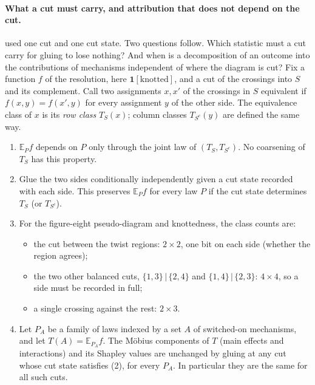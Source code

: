 \documentclass[11pt]{article}
\theoremstyle{definition}\newtheorem{definition}[theorem]{Definition}\newtheorem{remark}[theorem]{Remark}\newtheorem{example}[theorem]{Example}\newtheorem{problem}[theorem]{Open problem}\crefname{problem}{Problem}{Problems}
\begin{document}
\paragraph{What a cut must carry, and attribution that does not depend on the cut.}  used one cut and one cut state. Two questions follow. Which statistic must a cut carry for gluing to lose nothing? And when is a decomposition of an outcome into the contributions of mechanisms independent of where the diagram is cut? Fix a function $f$ of the resolution, here $\mathbf 1[\text{knotted}]$, and a cut of the crossings into $S$ and its complement. Call two assignments $x,x'$ of the crossings in $S$ equivalent if $f(x,y)=f(x',y)$ for every assignment $y$ of the other side. The equivalence class of $x$ is its \emph{row class} $T_S(x)$; column classes $T_{S^c}(y)$ are defined the same way.

\begin{proposition}\label{prop:boundary}
\begin{enumerate}
\item[(1)] $\mathbb E_Pf$ depends on $P$ only through the joint law of $(T_S,T_{S^c})$. No coarsening of $T_S$ has this property.
\item[(2)] Glue the two sides conditionally independently given a cut state recorded with each side. This preserves $\mathbb E_Pf$ for every law $P$ if the cut state determines $T_S$ (or $T_{S^c}$).
\item[(3)] For the figure-eight pseudo-diagram and knottedness, the class counts are:
\begin{itemize}
\item the cut between the twist regions: $2\times2$, one bit on each side (whether the region agrees);
\item the two other balanced cuts, $\{1,3\}\,|\,\{2,4\}$ and $\{1,4\}\,|\,\{2,3\}$: $4\times4$, so a side must be recorded in full;
\item a single crossing against the rest: $2\times3$.
\end{itemize}
\item[(4)] Let $P_A$ be a family of laws indexed by a set $A$ of switched-on mechanisms, and let $T(A)=\mathbb E_{P_A}f$. The M\"obius components of $T$ (main effects and interactions) and its Shapley values are unchanged by gluing at any cut whose cut state satisfies (2), for every $P_A$. In particular they are the same for all such cuts.
\end{enumerate}
\end{proposition}
\end{document}
